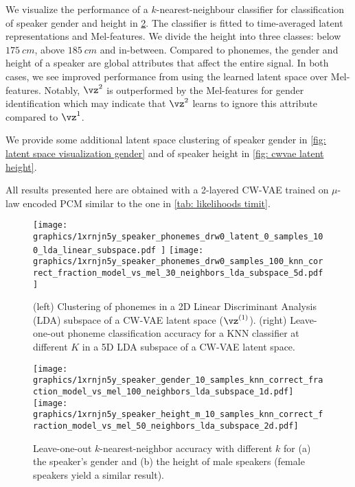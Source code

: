 {We visualize the performance of a $k$-nearest-neighbour classifier for classification of speaker gender and height in \cref{fig: knn fraction latent space height and gender}.
The classifier is fitted to time-averaged latent representations and Mel-features. 
We divide the height into three classes: below $\SI{175}{cm}$, above $\SI{185}{cm}$ and in-between. Compared to phonemes, the gender and height of a speaker are global attributes that affect the entire signal. 
In both cases, we see improved performance from using the learned latent space over Mel-features. Notably, $\vz^2$ is outperformed by the Mel-features for gender identification which may indicate that $\vz^2$ learns to ignore this attribute compared to $\vz^1$.

We provide some additional latent space clustering of speaker gender in \cref{fig: latent space visualization gender} and of speaker height in \cref{fig: cwvae latent height}.

All results presented here are obtained with a 2-layered CW-VAE trained on $\mu$-law encoded PCM similar to the one in \cref{tab: likelihoods timit}.


\begin{figure*}[t!]
    \centering
    \texttt{[image: 
        graphics/1xrnjn5y\_speaker\_phonemes\_drw0\_latent\_0\_samples\_100\_lda\_linear\_subspace.pdf
    ]}
    \hfill
    \texttt{[image: 
        graphics/1xrnjn5y\_speaker\_phonemes\_drw0\_samples\_100\_knn\_correct\_fraction\_model\_vs\_mel\_30\_neighbors\_lda\_subspace\_5d.pdf
    ]}
    \caption{
    (left) Clustering of phonemes in a 2D Linear Discriminant Analysis (LDA) subspace of a CW-VAE latent space ($\vz^{(1)}$).
    (right) Leave-one-out phoneme classification accuracy for a KNN classifier at different $K$ in a 5D LDA subspace of a CW-VAE latent space.
    }
    \label{fig: latent space phoneme and knn}
\end{figure*}


\begin{figure*}[t!]
     \centering
     \texttt{[image: graphics/1xrnjn5y\_speaker\_gender\_10\_samples\_knn\_correct\_fraction\_model\_vs\_mel\_100\_neighbors\_lda\_subspace\_1d.pdf]}
     \hfill
     \texttt{[image: graphics/1xrnjn5y\_speaker\_height\_m\_10\_samples\_knn\_correct\_fraction\_model\_vs\_mel\_50\_neighbors\_lda\_subspace\_2d.pdf]}
    \caption{
    Leave-one-out $k$-nearest-neighbor accuracy with different $k$ for
    (a) the speaker's gender and
    (b) the height of male speakers (female speakers yield a similar result).
    }
    \label{fig: knn fraction latent space height and gender}
\end{figure*}


}
